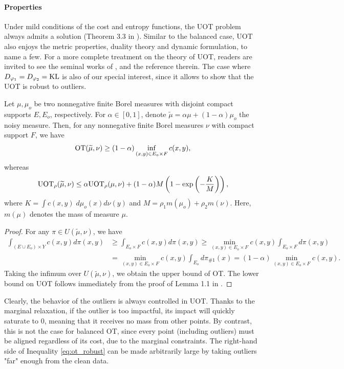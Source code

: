 \paragraph{Properties} Under mild conditions of the cost and entropy functions,
the UOT problem always admits a solution (Theorem 3.3 in \citep{Liero18}).
Similar to the balanced case, UOT also enjoys the metric properties, duality theory and
dynamic formulation, to name a few. For a more complete treatment on the theory of UOT,
readers are invited to see the seminal works of \citep{Liero18,Chizat18b}, and the reference therein.
The case where $D_{\varphi_1} = D_{\varphi_2} = \text{KL}$ is also of our special interest,
since it allows to show that the UOT is robust to outliers.
\begin{proposition}
  \label{prop:uot_robust}
  Let $\mu, \mu_o$ be two nonnegative finite Borel measures with disjoint compact supports $E, E_o$,
  respectively. For $\alpha \in [0, 1]$, denote $\widetilde{\mu} = \alpha \mu + (1 - \alpha) \mu_o$
  the noisy measure. Then, for any nonnegative finite Borel measures $\nu$
  with compact support $F$, we have
  \begin{align}
    \label{eq:ot_robust}
    \text{OT}(\widetilde{\mu}, \nu) \geq
    (1 - \alpha) \inf_{(x, y) \in E_o \times F} c(x, y),
  \end{align}
  whereas
  \begin{align}
    \text{UOT}_{\rho}(\widetilde{\mu}, \nu) \leq \alpha \text{UOT}_{\rho}(\mu, \nu) +
    (1 - \alpha) M
    \left( 1 - \exp \left( -\frac{K}{M} \right) \right),
  \end{align}
  where $K = \int c(x, y) \; d\mu_o(x) d\nu(y)$ and $M = \rho_1 m(\mu_o) + \rho_2 m(\nu)$.
  Here, $m(\mu)$ denotes the mass of measure $\mu$.
\end{proposition}
\begin{proof}
  For any $\pi \in U(\widetilde{\mu}, \nu)$, we have
  \begin{align}
      \int_{(E \cup E_o) \times Y} c(x, y) d\pi(x, y) &\geq \int_{E_o \times F} c(x, y) d\pi(x, y)
      \geq \min_{(x, y) \in E_o \times F} c(x, y ) \int_{E_o \times F} d\pi(x, y) \\
      &= \min_{(x, y) \in E_o \times F} c(x, y) \int_{E_o} d\pi_{\# 1}(x)
      = (1 - \alpha) \min_{(x, y) \in E_o \times F} c(x, y).
  \end{align}
  Taking the infimum over $U(\widetilde{\mu}, \nu)$, we obtain the upper bound of OT.
  The lower bound on UOT follows immediately from the proof of Lemma 1.1 in \citep{Fatras21}.
\end{proof}
Clearly, the behavior of the outliers is always controlled in UOT.
Thanks to the marginal relaxation, if the outlier is too impactful,
its impact will quickly saturate to $0$, meaning that it receives no mass from other points.
By contrast, this is not the case for balanced OT, since every point (including outliers)
must be aligned regardless of its cost, due to the marginal constraints. The right-hand side of
Inequality \ref{eq:ot_robust} can be made arbitrarily large by taking outliers "far" enough
from the clean data.

